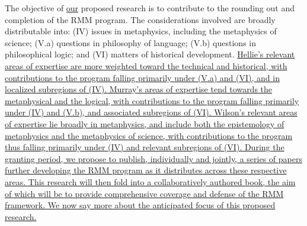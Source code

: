 \documentclass[12pt]{article}
\begin{document}
The objective of \ul{our} proposed research is to contribute to the rounding out
and completion of the RMM program. The considerations involved are broadly
distributable into: (IV) issues in metaphysics, including the metaphysics of
science; (V.a) questions in philosophy of
language; (V.b) questions in philosophical logic; and (VI) 
matters of historical development. \ul{Hellie's relevant areas of  
expertise are more weighted toward the technical and historical, with
contributions to the program falling primarily under (V.a) and (VI), and in 
localized subregions of (IV). Murray's areas of expertise tend towards the
metaphysical and the logical, with contributions to the program
falling primarily under (IV) and (V.b), and associated subregions of (VI). 
Wilson's relevant areas of expertise lie broadly in metaphysics, and include
both the epistemology of metaphysics and the metaphysics of
science, with contributions to the program thus falling primarily under (IV) and
relevant subregions of (VI). 
During the granting period, we propose to publish, individually and jointly, a
series of papers further developing the RMM program as it distributes across these respective areas. 
This research will then fold into a collaboratively authored book, the aim of which will be
to provide comprehensive coverage and defense of the RMM framework. We
now say more about the anticipated focus of this proposed research.} 

\begin{comment}
(Hellie) 
will take primary charge also of (VI) and certain issues under (IV)
(counterpart theory as under (II-B); chance--credence as under (IV-A); and
counterfactuals as under (IV-B)); I will also design the overarching
mathematical regime (and of course weigh in elsewhere).
\end{comment}

\smallskip{}
\end{document}
